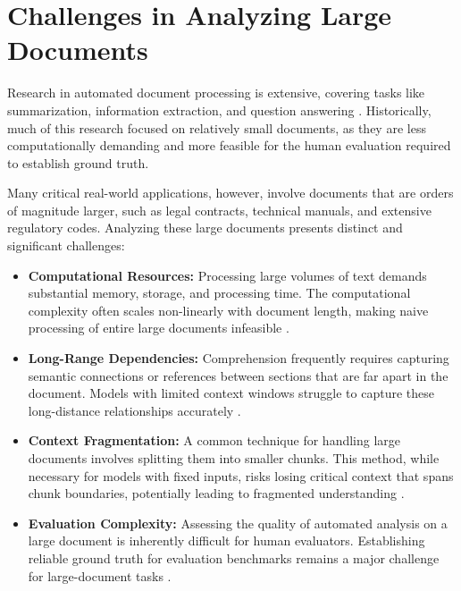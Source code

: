 \section{Challenges in Analyzing Large Documents} \label{sec:doc_processing}
Research in automated document processing is extensive, covering tasks like summarization, information extraction, and question answering \parencite{RefWorks:RefID:156-gambhir2017recent, RefWorks:RefID:121-zhong2024comprehensive, RefWorks:RefID:157-2017reading}. Historically, much of this research focused on relatively small documents, as they are less computationally demanding and more feasible for the human evaluation required to establish ground truth.

Many critical real-world applications, however, involve documents that are orders of magnitude larger, such as legal contracts, technical manuals, and extensive regulatory codes. Analyzing these large documents presents distinct and significant challenges:
\begin{itemize}
    \item \textbf{Computational Resources:} Processing large volumes of text demands substantial memory, storage, and processing time. The computational complexity often scales non-linearly with document length, making naive processing of entire large documents infeasible \parencite{RefWorks:RefID:81-vaswani2017attention}.
    \item \textbf{Long-Range Dependencies:} Comprehension frequently requires capturing semantic connections or references between sections that are far apart in the document. Models with limited context windows struggle to capture these long-distance relationships accurately \parencite{RefWorks:RefID:99-liu2025comprehensive, RefWorks:RefID:101-zhao2023survey}.
    \item \textbf{Context Fragmentation:} A common technique for handling large documents involves splitting them into smaller chunks. This method, while necessary for models with fixed inputs, risks losing critical context that spans chunk boundaries, potentially leading to fragmented understanding \parencite{RefWorks:RefID:105-chen2024dense, RefWorks:RefID:104-qu2024semantic}.
    \item \textbf{Evaluation Complexity:} Assessing the quality of automated analysis on a large document is inherently difficult for human evaluators. Establishing reliable ground truth for evaluation benchmarks remains a major challenge for large-document tasks \parencite{RefWorks:RefID:116-shaham2022scrolls}.
\end{itemize}

